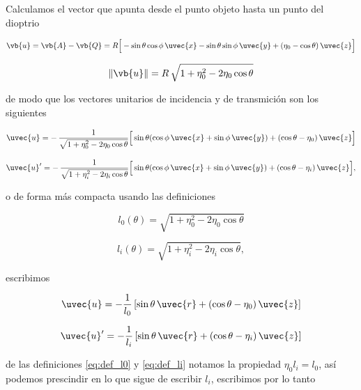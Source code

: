 Calculamos el vector que apunta desde el punto objeto hasta un punto del dioptrio

\begin{equation}
\vb{u} = \vb{A}-\vb{Q}
= R\Big[-\sin\theta\cos\phi\,\uvec{x}
        -\sin\theta\sin\phi\,\uvec{y}
        +(\eta_0-\cos\theta)\,\uvec{z}\Big]
\label{eq:u_vec}
\end{equation}

\begin{equation}
\|\vb{u}\|
= R\,\sqrt{1+\eta_0^2-2\eta_0\cos\theta} 
\label{eq:u_norm}
\end{equation}

de modo que los vectores unitarios de incidencia y de transmición son los siguientes

\begin{equation}
\uvec{u}
= -\,\frac{1}{\sqrt{1+\eta_0^2-2\eta_0\cos\theta}}
\Big[\sin\theta(\cos\phi\,\uvec{x}+\sin\phi\,\uvec{y})
+(\cos\theta - \eta_0)\,\uvec{z}\Big]
\label{eq:u_hat}
\end{equation}

\begin{equation}
\uvec{u}'
= -\,\frac{1}{\sqrt{1+\eta_i^2-2\eta_i\cos\theta}}
\Big[\sin\theta(\cos\phi\,\uvec{x}+\sin\phi\,\uvec{y})
+(\cos\theta - \eta_i)\,\uvec{z}\Big], 
\label{eq:u_hat_prime}
\end{equation} 


o de forma más compacta usando las definiciones 


\begin{equation}
    l_0(\theta) = \sqrt{1 + \eta_0^2 - 2\eta_0 \cos \theta} 
    \label{eq:def_l0}
\end{equation}

\begin{equation}
    l_i(\theta) = \sqrt{1 + \eta_i^2 - 2\eta_i \cos \theta}, 
    \label{eq:def_li}
\end{equation}

escribimos 


\begin{equation}
  \uvec{u} = -\frac{1}{l_0}\left[\sin\theta\,\uvec{r} +
(\cos\theta - \eta_0)\,\uvec{z}\right]
\end{equation}

\begin{equation}
  \uvec{u}' = -\frac{1}{l_i}\left[\sin\theta\,\uvec{r} +
(\cos\theta - \eta_i)\,\uvec{z}\right]
\end{equation}


de las definiciones \ref{eq:def_l0} y \ref{eq:def_li} notamos la propiedad 
$\eta_0 l_i = l_0$, así podemos prescindir en lo que sigue de escribir $l_i$, escribimos por lo tanto


